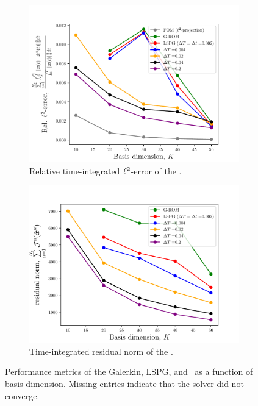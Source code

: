 \begin{figure}
\begin{center}
\begin{subfigure}[t]{0.45\textwidth}
\includegraphics[width=1.\linewidth]{figs/sod/error_converge.pdf}
\caption{Relative time-integrated $\ell^2$-error of the \methodAcronymROM.}
\label{fig:sod_error_converge}
\end{subfigure}
\begin{subfigure}[t]{0.45\textwidth}
\includegraphics[width=1.\linewidth]{figs/sod/residual_converge.pdf}
\caption{Time-integrated residual norm of the \methodAcronymROM.} 
\label{fig:sod_residual_converge}
\end{subfigure}
\caption{Performance metrics of the Galerkin, LSPG, and \methodAcronymROMs\ as a function of basis dimension. Missing entries indicate that the solver did not converge.} 
\label{fig:convergence_study}
\end{center}
\end{figure}

